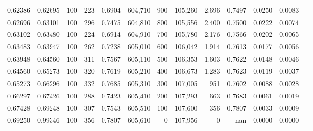 \begin{tabular}{rrrrrrrrrrrrr}
0.62386 & 0.62695 &    100 & 223 &                                     0.6904 & 604,710 &     900 & 105,260 &   2,696 & 0.7497 & 0.0250 & 0.0083 \\
0.62696 & 0.63101 &    100 & 296 &                                     0.7475 & 604,810 &     800 & 105,556 &   2,400 & 0.7500 & 0.0222 & 0.0074 \\
0.63102 & 0.63480 &    100 & 224 &                                     0.6914 & 604,910 &     700 & 105,780 &   2,176 & 0.7566 & 0.0202 & 0.0065 \\
0.63483 & 0.63947 &    100 & 262 &                                     0.7238 & 605,010 &     600 & 106,042 &   1,914 & 0.7613 & 0.0177 & 0.0056 \\
0.63948 & 0.64560 &    100 & 311 &                                     0.7567 & 605,110 &     500 & 106,353 &   1,603 & 0.7622 & 0.0148 & 0.0046 \\
0.64560 & 0.65273 &    100 & 320 &                                     0.7619 & 605,210 &     400 & 106,673 &   1,283 & 0.7623 & 0.0119 & 0.0037 \\
0.65273 & 0.66296 &    100 & 332 &                                     0.7685 & 605,310 &     300 & 107,005 &     951 & 0.7602 & 0.0088 & 0.0028 \\
0.66297 & 0.67426 &    100 & 288 &                                     0.7423 & 605,410 &     200 & 107,293 &     663 & 0.7683 & 0.0061 & 0.0019 \\
0.67428 & 0.69248 &    100 & 307 &                                     0.7543 & 605,510 &     100 & 107,600 &     356 & 0.7807 & 0.0033 & 0.0009 \\
0.69250 & 0.99346 &    100 & 356 &                                     0.7807 & 605,610 &       0 & 107,956 &       0 &    nan & 0.0000 & 0.0000 \\
\bottomrule
\end{tabular}
